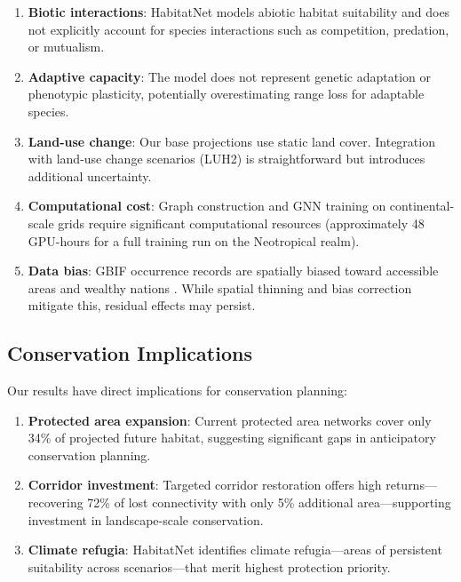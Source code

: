 \documentclass[11pt,a4paper]{article}
\begin{document}
\begin{enumerate}
  \item \textbf{Biotic interactions}: HabitatNet models abiotic habitat
    suitability and does not explicitly account for species interactions
    such as competition, predation, or mutualism.
  \item \textbf{Adaptive capacity}: The model does not represent genetic
    adaptation or phenotypic plasticity, potentially overestimating range
    loss for adaptable species.
  \item \textbf{Land-use change}: Our base projections use static land
    cover. Integration with land-use change scenarios (LUH2) is
    straightforward but introduces additional uncertainty.
  \item \textbf{Computational cost}: Graph construction and GNN training
    on continental-scale grids require significant computational
    resources (approximately 48 GPU-hours for a full training run on
    the Neotropical realm).
  \item \textbf{Data bias}: GBIF occurrence records are spatially biased
    toward accessible areas and wealthy nations
    \citep{beck2014spatial}. While spatial thinning and bias correction
    mitigate this, residual effects may persist.
\end{enumerate}

\subsection{Conservation Implications}

Our results have direct implications for conservation planning:

\begin{enumerate}
  \item \textbf{Protected area expansion}: Current protected area
    networks cover only 34\% of projected future habitat, suggesting
    significant gaps in anticipatory conservation planning.
  \item \textbf{Corridor investment}: Targeted corridor restoration
    offers high returns---recovering 72\% of lost connectivity with only
    5\% additional area---supporting investment in landscape-scale
    conservation.
  \item \textbf{Climate refugia}: HabitatNet identifies climate
    refugia---areas of persistent suitability across scenarios---that
    merit highest protection priority.
\end{enumerate}
\end{document}
